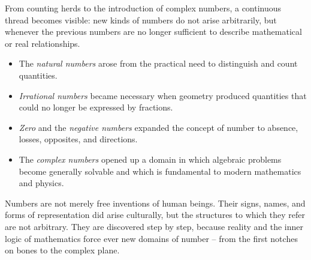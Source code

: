 From counting herds to the introduction of complex numbers,
a continuous thread becomes visible:
new kinds of numbers do not arise arbitrarily,
but whenever the previous numbers are no longer sufficient
to describe mathematical or real relationships.

\begin{itemize}
	\item The \emph{natural numbers}
	arose from the practical need to distinguish and count quantities.
	\item \emph{Irrational numbers}
	became necessary when geometry produced quantities
	that could no longer be expressed by fractions.
	\item \emph{Zero}
	and the \emph{negative numbers}
	expanded the concept of number to absence, losses, opposites, and directions.
	\item The \emph{complex numbers}
	opened up a domain in which algebraic problems
	become generally solvable and which is fundamental
	to modern mathematics and physics.
\end{itemize}

\begin{NoteBox}
	\label{box:universal_numbers}
	Numbers are not merely free inventions of human beings.
	Their signs, names, and forms of representation did arise culturally,
	but the structures to which they refer are not arbitrary.
	They are discovered step by step,
	because reality and the inner logic of mathematics
	force ever new domains of number --
	from the first notches on bones
	to the complex plane.
\end{NoteBox}